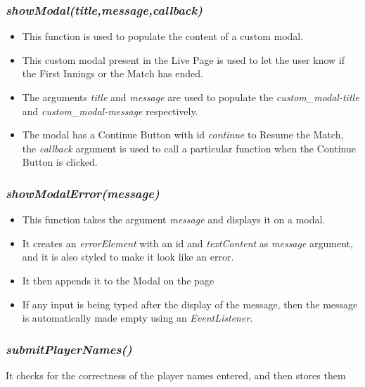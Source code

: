 \documentclass[a4paper,12pt]{article}
\begin{document}
\subsubsection{\textit{showModal(title,message,callback)}}
\begin{itemize}
\item This function is used to populate the content of a custom modal.
\item This custom modal present in the Live Page is used to let the user know if the First Innings or the Match has ended.
\item The arguments \textit{title} and \textit{message} are used to populate the \textit{custom\_modal-title} and \textit{custom\_modal-message} respectively.
\item The modal has a Continue Button with id \textit{continue} to Resume the Match, the \textit{callback} argument is used to call a particular function when the Continue Button is clicked.  
\end{itemize}

\subsubsection{\textit{showModalError(message)}}
\begin{itemize}
\item This function takes the argument \textit{message} and displays it on a modal.
\item It creates an \textit{errorElement} with an id and \textit{textContent} as \textit{message} argument, and it is also styled to make it look like an error.
\item It then appends it to the Modal on the page
\item If any input is being typed after the display of the message, then the message is automatically made empty using an \textit{EventListener}.
\end{itemize}

\subsubsection{\textit{submitPlayerNames()}}
It checks for the correctness of the player names entered, and then stores them
\end{document}
